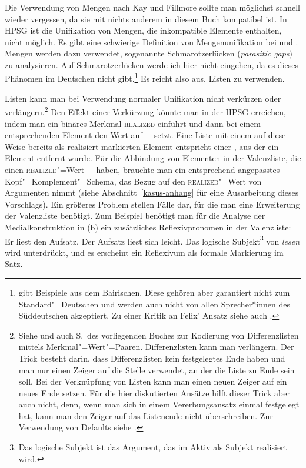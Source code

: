 \subsubsection{}
\label{sec-vererbung-koenig}

Die Verwendung von Mengen nach Kay und Fillmore sollte man möglichst schnell wieder vergessen,
da sie mit nichts anderem in diesem Buch kompatibel ist. In HPSG ist die Unifikation von Mengen,
die inkompatible Elemente enthalten, nicht möglich. Es gibt eine schwierige Definition von Mengenunifikation
bei \citet[--49]{ps} und \citet{PM90a}. Mengen werden dazu verwendet, sogenannte Schmarotzerlücken (\emph{parasitic gaps})
zu analysieren. Auf Schmarotzerlücken werde ich hier nicht eingehen, da es dieses Phänomen im Deutschen
nicht gibt.\footnote{
        \citet*{Felix85} gibt Beispiele aus dem Bairischen. 
        Diese gehören aber garantiert nicht zum Standard"=Deutschen und
        werden auch nicht von allen Sprecher*innen des Süddeutschen akzeptiert. 
        Zu einer Kritik an Felix' Ansatz siehe auch 
        \citet*[]{Oppenrieder91a}.
}
Es reicht also aus, Listen zu verwenden.

Listen kann man bei Verwendung normaler Unifikation nicht verkürzen oder verlängern.\footnote{%
Siehe \citet[104]{Copestake2002a} und auch S.\,\pageref{page-difflists} des vorliegenden Buches zur Kodierung von Differenzlisten mittels
Merkmal"=Wert"=Paaren. Differenzlisten kann man verlängern. Der Trick besteht darin, dass
Differenzlisten kein festgelegtes Ende haben und man nur einen Zeiger auf die Stelle verwendet, an
der die Liste zu Ende sein soll. Bei der Verknüpfung von Listen kann man einen neuen Zeiger auf ein
neues Ende setzen. Für die hier diskutierten Ansätze hilft dieser Trick aber auch nicht, denn, wenn
man sich in einem Vererbungsansatz einmal festgelegt hat, kann man den Zeiger auf das Listenende
nicht überschreiben. Zur Verwendung von Defaults siehe .
}
Den Effekt
einer Verkürzung könnte man in der HPSG erreichen, indem man ein binäres Merkmal \textsc{realized}
einführt und dann bei einem entsprechenden Element den Wert auf $+$ setzt. 
Eine Liste mit einem auf diese Weise bereits als realisiert markierten Element entspricht
einer \compsl, aus der ein Element entfernt wurde. Für die Abbindung von Elementen
in der Valenzliste, die einen \textsc{realized}"=Wert $-$ haben, brauchte man ein entsprechend
angepasstes Kopf"=Komplement"=Schema, das Bezug auf den \textsc{realized}"=Wert von Argumenten nimmt
(siehe Abschnitt~\ref{kasus-anhang} für eine Ausarbeitung dieses Vorschlags).
Ein größeres Problem stellen Fälle dar, für die man eine Erweiterung der Valenzliste
benötigt. Zum Beispiel benötigt man für die Analyse der Medialkonstruktion in (b)
ein zusätzliches Reflexivpronomen in der Valenzliste:
\eal
\ex Er          liest den Aufsatz.
\ex Der Aufsatz liest sich leicht.
\zl
Das logische Subjekt\footnote{
  Das logische Subjekt ist das Argument, das im Aktiv als Subjekt realisiert wird.%
}
von \emph{lesen} wird unterdrückt, und es erscheint ein Reflexivum als
formale Markierung im Satz.
\largerpage

